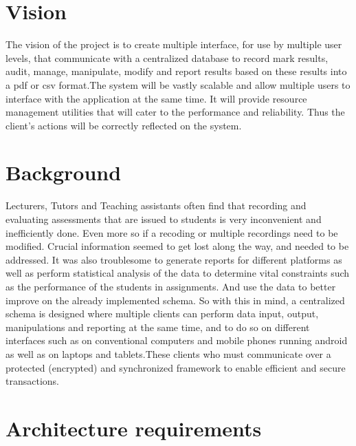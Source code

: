 \documentclass[10pt,a4paper]{article}
\begin{document}
\section{Vision}
The vision of the project is to create multiple interface, for use by multiple user levels, that communicate with a centralized database to record mark results, audit, manage, manipulate, modify and report results based on these results into a pdf or csv format.\linebreak The system will be vastly scalable and allow multiple users to interface with the application at the same time. It will provide resource management utilities that will cater to the performance and reliability. Thus the client’s actions will be correctly reflected on the system.

\section{Background}
Lecturers, Tutors and Teaching assistants often find that recording and evaluating assessments that are issued to students is very inconvenient and inefficiently done. Even more so if a recoding or multiple recordings need to be modified. Crucial information seemed to get lost along the way, and needed to be addressed.\linebreak
It was also troublesome to generate reports for different platforms as well as perform statistical analysis of the data to determine vital constraints such as the performance of the students in assignments. And use the data to better improve on the already implemented schema.\linebreak
So with this in mind, a centralized schema is designed where multiple clients can perform data input, output, manipulations and reporting at the same time, and to do so on different interfaces such as on conventional computers and mobile phones running android as well as on laptops and tablets.\linebreak These clients who must communicate over a protected (encrypted) and synchronized framework to enable efficient and secure transactions. 


\section{Architecture requirements}
\end{document}
